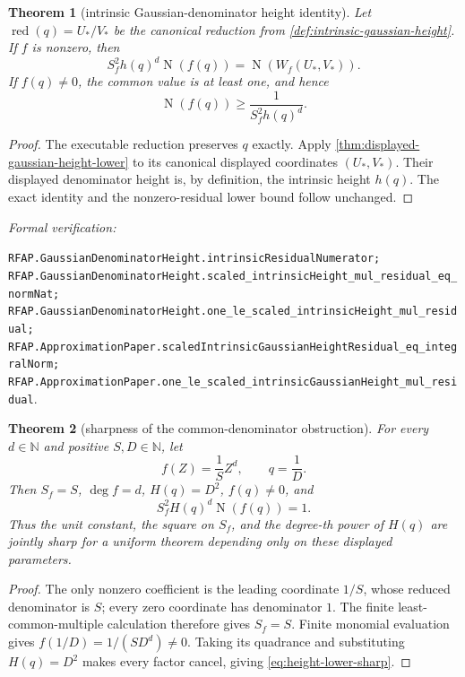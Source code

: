 \documentclass[11pt]{article}
\newtheorem{theorem}{Theorem}[section]
\newcommand{\N}{\mathbb{N}}
\newcommand{\Norm}[1]{\operatorname{N}\!\left(#1\right)}
\newcommand{\leanref}[1]{\par\smallskip\noindent
  \emph{Formal verification:}\par\nobreak
  {\raggedright\nolinkurl{#1}.\par}}
\begin{document}
\begin{theorem}[intrinsic Gaussian-denominator height identity]
\label{thm:gaussian-height-lower}
Let $\operatorname{red}(q)=U_*/V_*$ be the canonical reduction from
\cref{def:intrinsic-gaussian-height}.  If $f$ is nonzero, then
\begin{equation}
\label{eq:gaussian-height-identity}
 S_f^2h(q)^d\Norm{f(q)}=\Norm{W_f(U_*,V_*)}.
\end{equation}
If $f(q)\ne0$, the common value is at least one, and hence
\begin{equation}
\label{eq:gaussian-height-lower}
                         \Norm{f(q)}\ge
                         \frac1{S_f^2h(q)^d}.
\end{equation}
\end{theorem}

\begin{proof}
The executable reduction preserves $q$ exactly.  Apply
\cref{thm:displayed-gaussian-height-lower} to its canonical displayed
coordinates $(U_*,V_*)$.  Their displayed denominator height is, by
definition, the intrinsic height $h(q)$.  The exact identity and the
nonzero-residual lower bound follow unchanged.
\end{proof}

\leanref{RFAP.GaussianDenominatorHeight.intrinsicResidualNumerator;
RFAP.GaussianDenominatorHeight.scaled_intrinsicHeight_mul_residual_eq_normNat;
RFAP.GaussianDenominatorHeight.one_le_scaled_intrinsicHeight_mul_residual;
RFAP.ApproximationPaper.scaledIntrinsicGaussianHeightResidual_eq_integralNorm;
RFAP.ApproximationPaper.one_le_scaled_intrinsicGaussianHeight_mul_residual}

\begin{theorem}[sharpness of the common-denominator obstruction]
\label{thm:height-lower-sharp}
For every $d\in\N$ and positive $S,D\in\N$, let
\[
                         f(Z)=\frac1S Z^d,
                 \qquad q=\frac1D.
\]
Then $S_f=S$, $\deg f=d$, $H(q)=D^2$, $f(q)\ne0$, and
\begin{equation}
\label{eq:height-lower-sharp}
                     S_f^2H(q)^d\Norm{f(q)}=1.
\end{equation}
Thus the unit constant, the square on $S_f$, and the degree-th power of
$H(q)$ are jointly sharp for a uniform theorem depending only on these
displayed parameters.
\end{theorem}

\begin{proof}
The only nonzero coefficient is the leading coordinate $1/S$, whose reduced
denominator is $S$; every zero coordinate has denominator $1$.  The finite
least-common-multiple calculation therefore gives $S_f=S$.
Finite monomial evaluation gives $f(1/D)=1/(SD^d)\ne0$.  Taking its
quadrance and substituting $H(q)=D^2$ makes every factor cancel, giving
\eqref{eq:height-lower-sharp}.
\end{proof}
\end{document}
